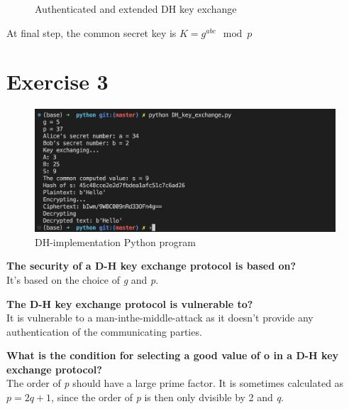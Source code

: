 \documentclass{article}
\begin{document}
\begin{figure}[!hpt]

    \caption{Authenticated and extended DH key exchange \cite{3_exchange}\cite{course_slides}}
\end{figure}

At final step, the common secret key is \(K = g^{abc} \mod p\)

\section*{Exercise 3}
%
\begin{figure}[!hpt]
    \centering
    \includegraphics[width=\textwidth, height=\textheight, keepaspectratio]{DH_implementation.png}
    \caption{DH-implementation Python program}
\end{figure}

\textbf{The security of a D-H key exchange protocol is based on?}\\
It's based on the choice of \emph{g} and \emph{p}.

\textbf{The D-H key exchange protocol is vulnerable to?}\\
It is vulnerable to a man-inthe-middle-attack as it doesn't provide
any authentication of the communicating parties.

\textbf{What is the condition for selecting a good value of o in a D-H key exchange protocol?}\\
The order of \emph{p} should have a large prime factor. It is sometimes
calculated as \(p = 2q + 1\), since the order of \emph{p} is then only dvisible
by 2 and \emph{q}\cite{wiki}.

\printbibliography{}
\end{document}
